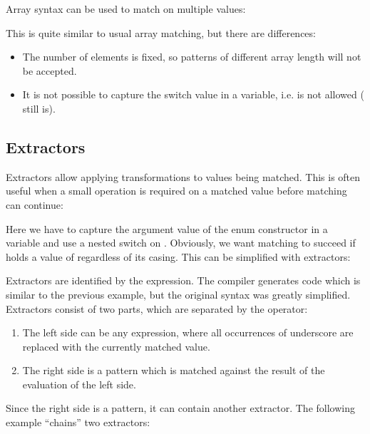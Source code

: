 Array syntax can be used to match on multiple values:


This is quite similar to usual array matching, but there are differences:

\begin{itemize}
	\item The number of elements is fixed, so patterns of different array length will not be accepted.
	\item It is not possible to capture the switch value in a variable, i.e.  is not allowed ( still is).
\end{itemize}




\subsection{Extractors}
\label{lf-pattern-matching-extractors}

Extractors allow applying transformations to values being matched. This is often useful when a small operation is required on a matched value before matching can continue:


Here we have to capture the argument value of the  enum constructor in a variable  and use a nested switch on . Obviously, we want matching to succeed if  holds a value of  regardless of its casing. This can be simplified with extractors:


Extractors are identified by the  expression. The compiler generates code which is similar to the previous example, but the original syntax was greatly simplified. Extractors consist of two parts, which are separated by the \expr{=>} operator:

\begin{enumerate}
\item The left side can be any expression, where all occurrences of underscore \expr{_} are replaced with the currently matched value.
\item The right side is a pattern which is matched against the result of the evaluation of the left side.
\end{enumerate}

Since the right side is a pattern, it can contain another extractor. The following example ``chains'' two extractors:

